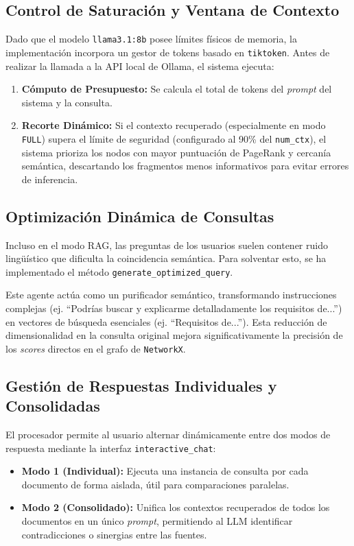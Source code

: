 \subsection{Control de Saturación y Ventana de Contexto}
Dado que el modelo \texttt{llama3.1:8b} posee límites físicos de memoria, la implementación incorpora un gestor de tokens basado en \texttt{tiktoken}. Antes de realizar la llamada a la API local de Ollama, el sistema ejecuta:
\begin{enumerate}
    \item \textbf{Cómputo de Presupuesto:} Se calcula el total de tokens del \textit{prompt} del sistema y la consulta.
    \item \textbf{Recorte Dinámico:} Si el contexto recuperado (especialmente en modo \texttt{FULL}) supera el límite de seguridad (configurado al 90\% del \texttt{num\_ctx}), el sistema prioriza los nodos con mayor puntuación de PageRank y cercanía semántica, descartando los fragmentos menos informativos para evitar errores de inferencia.
\end{enumerate}

\subsection{Optimización Dinámica de Consultas}
Incluso en el modo RAG, las preguntas de los usuarios suelen contener ruido lingüístico que dificulta la coincidencia semántica. Para solventar esto, se ha implementado el método \texttt{generate\_opti\-mized\_query}.

Este agente actúa como un purificador semántico, transformando instrucciones complejas (ej. ``Podrías buscar y explicarme detalladamente los requisitos de...'') en vectores de búsqueda esenciales (ej. ``Requisitos de...''). Esta reducción de dimensionalidad en la consulta original mejora significativamente la precisión de los \textit{scores} directos en el grafo de \texttt{NetworkX}.

\subsection{Gestión de Respuestas Individuales y Consolidadas}
El procesador permite al usuario alternar dinámicamente entre dos modos de respuesta mediante la interfaz \texttt{interactive\_chat}:
\begin{itemize}
    \item \textbf{Modo 1 (Individual):} Ejecuta una instancia de consulta por cada documento de forma aislada, útil para comparaciones paralelas.
    \item \textbf{Modo 2 (Consolidado):} Unifica los contextos recuperados de todos los documentos en un único \textit{prompt}, permitiendo al LLM identificar contradicciones o sinergias entre las fuentes.
\end{itemize}

